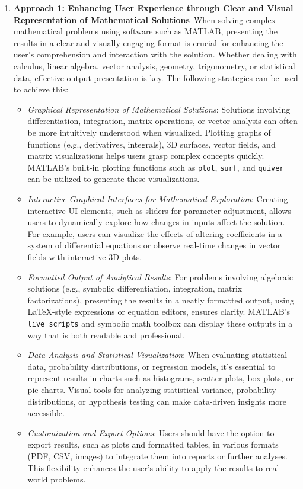 \documentclass[a4paper, 12pt]{report}
\begin{document}
\begin{itemize}
        \begin{enumerate}[itemsep=-0.1cm] 
            \item \textbf{Approach 1: Enhancing User Experience through Clear and Visual Representation of Mathematical Solutions}\ When solving complex mathematical problems using software such as MATLAB, presenting the results in a clear and visually engaging format is crucial for enhancing the user’s comprehension and interaction with the solution. Whether dealing with calculus, linear algebra, vector analysis, geometry, trigonometry, or statistical data, effective output presentation is key. The following strategies can be used to achieve this: \begin{itemize}[itemsep=-0.1cm] \item \textit{Graphical Representation of Mathematical Solutions}: Solutions involving differentiation, integration, matrix operations, or vector analysis can often be more intuitively understood when visualized. Plotting graphs of functions (e.g., derivatives, integrals), 3D surfaces, vector fields, and matrix visualizations helps users grasp complex concepts quickly. MATLAB's built-in plotting functions such as \texttt{plot}, \texttt{surf}, and \texttt{quiver} can be utilized to generate these visualizations. \item \textit{Interactive Graphical Interfaces for Mathematical Exploration}: Creating interactive UI elements, such as sliders for parameter adjustment, allows users to dynamically explore how changes in inputs affect the solution. For example, users can visualize the effects of altering coefficients in a system of differential equations or observe real-time changes in vector fields with interactive 3D plots. \item \textit{Formatted Output of Analytical Results}: For problems involving algebraic solutions (e.g., symbolic differentiation, integration, matrix factorizations), presenting the results in a neatly formatted output, using LaTeX-style expressions or equation editors, ensures clarity. MATLAB's \texttt{live scripts} and symbolic math toolbox can display these outputs in a way that is both readable and professional. \item \textit{Data Analysis and Statistical Visualization}: When evaluating statistical data, probability distributions, or regression models, it's essential to represent results in charts such as histograms, scatter plots, box plots, or pie charts. Visual tools for analyzing statistical variance, probability distributions, or hypothesis testing can make data-driven insights more accessible. \item \textit{Customization and Export Options}: Users should have the option to export results, such as plots and formatted tables, in various formats (PDF, CSV, images) to integrate them into reports or further analyses. This flexibility enhances the user’s ability to apply the results to real-world problems. \end{itemize}

\end{enumerate}
\end{itemize}
\end{document}

